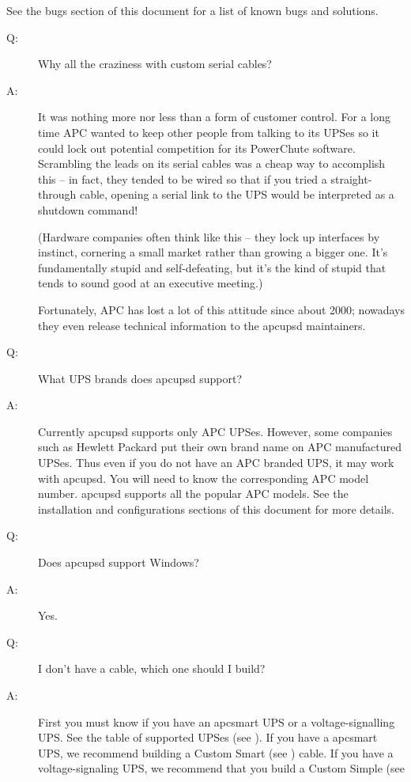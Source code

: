 {{{{{{\label{index-FAQ-147}
See the bugs section of this document for a list of known bugs and solutions. 


\begin{description}

\item [\label{crazy}
   Q:]
Why all the craziness with custom serial cables?  

\item [A:]
   It was nothing more nor less than a form of customer control. For a long time
APC wanted to keep other people from talking to its UPSes so it could lock out
potential competition for its PowerChute software.  Scrambling the leads on
its serial cables was a cheap way to accomplish this {--} in fact, they tended
to be wired so that if you tried a straight-through cable, opening a serial
link to the UPS would be interpreted as a shutdown command!  

(Hardware companies often think like this {--} they lock up interfaces by
instinct, cornering a small market rather than growing a bigger one.  It's
fundamentally stupid and self-defeating, but it's the kind of stupid that
tends to sound good at an executive meeting.)  

Fortunately, APC has lost a lot of this attitude since about 2000; nowadays
they even release technical information to the apcupsd maintainers.  

\item [Q:]
   What UPS brands does apcupsd support?  

\item [A:]
   Currently apcupsd supports only APC UPSes. However, some companies such as
Hewlett Packard put their own brand name on APC manufactured UPSes. Thus even
if you do not have an APC branded UPS, it may work with apcupsd. You will need
to know the corresponding APC model number. apcupsd supports all the popular
APC models. See the installation and configurations sections of this document
for more details.  

\item [Q:]
   Does apcupsd support Windows?  

\item [A:]
   Yes.  

\item [Q:]
   I don't have a cable, which one should I build?  

\item [A:]
   First you must know if you have an apcsmart UPS or a voltage-signalling UPS.
See the table of supported UPSes (see 
). If you have a apcsmart UPS,
we recommend building a Custom Smart (see 
) cable. If you
have a voltage-signaling UPS, we recommend that you build a Custom Simple (see


\end{description}}}}}}}
